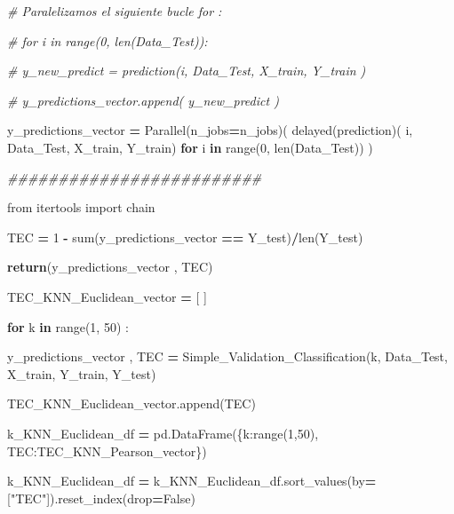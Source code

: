 \documentclass[
  11pt,
  a4paper,
]{article}
\newenvironment{Shaded}{\begin{snugshade}}{\end{snugshade}}
\newcommand{\BuiltInTok}[1]{#1}
\newcommand{\CommentTok}[1]{\textcolor[rgb]{0.56,0.35,0.01}{\textit{#1}}}
\newcommand{\ControlFlowTok}[1]{\textcolor[rgb]{0.13,0.29,0.53}{\textbf{#1}}}
\newcommand{\DecValTok}[1]{\textcolor[rgb]{0.00,0.00,0.81}{#1}}
\newcommand{\ImportTok}[1]{#1}
\newcommand{\KeywordTok}[1]{\textcolor[rgb]{0.13,0.29,0.53}{\textbf{#1}}}
\newcommand{\NormalTok}[1]{#1}
\newcommand{\OperatorTok}[1]{\textcolor[rgb]{0.81,0.36,0.00}{\textbf{#1}}}
\newcommand{\StringTok}[1]{\textcolor[rgb]{0.31,0.60,0.02}{#1}}
\newcommand{\VariableTok}[1]{\textcolor[rgb]{0.00,0.00,0.00}{#1}}
\begin{document}
\begin{Shaded}
\begin{Highlighting}[]
    \CommentTok{\# Paralelizamos el siguiente bucle for :}

    \CommentTok{\# for i in  range(0, len(Data\_Test)):}

        \CommentTok{\# y\_new\_predict = prediction(i, Data\_Test, X\_train, Y\_train )}

        \CommentTok{\# y\_predictions\_vector.append( y\_new\_predict )}

    
\NormalTok{    y\_predictions\_vector }\OperatorTok{=}\NormalTok{ Parallel(n\_jobs}\OperatorTok{=}\NormalTok{n\_jobs)( delayed(prediction)( i, Data\_Test, X\_train, Y\_train) }\ControlFlowTok{for}\NormalTok{ i }\KeywordTok{in} \BuiltInTok{range}\NormalTok{(}\DecValTok{0}\NormalTok{, }\BuiltInTok{len}\NormalTok{(Data\_Test)) )}

    \CommentTok{\#\#\#\#\#\#\#\#\#\#\#\#\#\#\#\#\#\#\#\#\#\#\#\#\#}

    \ImportTok{from}\NormalTok{ itertools }\ImportTok{import}\NormalTok{ chain}

\NormalTok{    TEC }\OperatorTok{=} \DecValTok{1} \OperatorTok{{-}} \BuiltInTok{sum}\NormalTok{(y\_predictions\_vector }\OperatorTok{==}\NormalTok{ Y\_test)}\OperatorTok{/}\BuiltInTok{len}\NormalTok{(Y\_test)     }

 
    \ControlFlowTok{return}\NormalTok{(y\_predictions\_vector , TEC)}
\end{Highlighting}
\end{Shaded}

\begin{Shaded}
\begin{Highlighting}[]
\NormalTok{TEC\_KNN\_Euclidean\_vector }\OperatorTok{=}\NormalTok{ [ ]}

\ControlFlowTok{for}\NormalTok{ k }\KeywordTok{in} \BuiltInTok{range}\NormalTok{(}\DecValTok{1}\NormalTok{, }\DecValTok{50}\NormalTok{) :}

\NormalTok{    y\_predictions\_vector , TEC }\OperatorTok{=}\NormalTok{ Simple\_Validation\_Classification(k, Data\_Test, X\_train, Y\_train, Y\_test)}

\NormalTok{    TEC\_KNN\_Euclidean\_vector.append(TEC)}
\end{Highlighting}
\end{Shaded}

\begin{Shaded}
\begin{Highlighting}[]
\NormalTok{k\_KNN\_Euclidean\_df }\OperatorTok{=}\NormalTok{ pd.DataFrame(\{}\StringTok{\textquotesingle{}k\textquotesingle{}}\NormalTok{:}\BuiltInTok{range}\NormalTok{(}\DecValTok{1}\NormalTok{,}\DecValTok{50}\NormalTok{), }\StringTok{\textquotesingle{}TEC\textquotesingle{}}\NormalTok{:TEC\_KNN\_Pearson\_vector\})}

\NormalTok{k\_KNN\_Euclidean\_df }\OperatorTok{=}\NormalTok{ k\_KNN\_Euclidean\_df.sort\_values(by}\OperatorTok{=}\NormalTok{[}\StringTok{"TEC"}\NormalTok{]).reset\_index(drop}\OperatorTok{=}\VariableTok{False}\NormalTok{)}
\end{Highlighting}
\end{Shaded}
\end{document}
